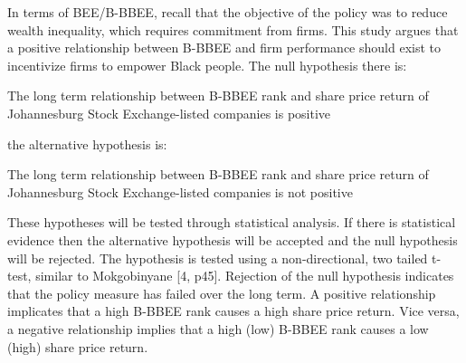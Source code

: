In terms of BEE/B-BBEE, recall that the objective of the policy was to reduce wealth inequality, which requires commitment from firms. This study argues that a positive relationship between B-BBEE and firm performance should exist to incentivize firms to empower Black people. The null hypothesis there is:
\begin{nullhypothesis}The long term relationship between B-BBEE rank and share price return of Johannesburg Stock Exchange-listed companies is positive\end{nullhypothesis}
the alternative hypothesis is:
\begin{alternativehypothesis}The long term relationship between B-BBEE rank and share price return of Johannesburg Stock Exchange-listed companies is not positive\end{alternativehypothesis}
These hypotheses will be tested through statistical analysis. If there is statistical evidence then the alternative hypothesis will be accepted and the null hypothesis will be rejected. The hypothesis is tested using a non-directional, two tailed t-test, similar to Mokgobinyane [4, p45]. Rejection of the null hypothesis indicates that the policy measure has failed over the long term. A positive relationship implicates that a high B-BBEE rank causes a high share price return. Vice versa, a negative relationship implies that a high (low) B-BBEE rank causes a low (high) share price return.
